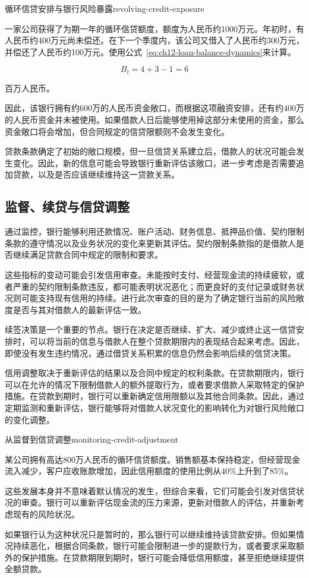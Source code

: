 \begin{example}{循环信贷安排与银行风险暴露}{revolving-credit-exposure}

一家公司获得了为期一年的循环信贷额度，额度为人民币约1000万元。年初时，有人民币约400万元尚未偿还。在下一个季度内，该公司又借入了人民币约300万元，并偿还了人民币约100万元。使用公式~\ref{eq:ch12-loan-balance-dynamics}来计算。

\[
B_t=4+3-1=6
\]

百万人民币。

因此，该银行拥有约600万的人民币资金敞口，而根据这项融资安排，还有约400万的人民币资金并未被使用。如果借款人日后能够使用掉这部分未使用的资金，那么资金敞口将会增加，但合同规定的信贷限额则不会发生变化。

\end{example}

贷款条款确定了初始的敞口规模，但一旦信贷关系建立后，借款人的状况可能会发生变化。因此，新的信息可能会导致银行重新评估该敞口，进一步考虑是否需要追加贷款，以及是否应该继续维持这一贷款关系。

\subsection{监督、续贷与信贷调整}

通过监控，银行能够利用还款情况、账户活动、财务信息、抵押品价值、契约限制条款的遵守情况以及业务状况的变化来更新其评估。契约限制条款指的是借款人是否继续满足贷款合同中规定的限制和要求。

这些指标的变动可能会引发信用审查。未能按时支付、经营现金流的持续疲软，或者严重的契约限制条款违反，都可能表明状况恶化；而更良好的支付记录或财务状况则可能支持现有信用的持续。进行此次审查的目的是为了确定银行当前的风险敞度是否与其对借款人的最新评估一致。

续签决策是一个重要的节点。银行在决定是否继续、扩大、减少或终止这一信贷安排时，可以将当前的信息与借款人在整个贷款期限内的表现结合起来考虑。因此，即使没有发生违约情况，通过借贷关系积累的信息仍然会影响后续的信贷决策。

信用调整取决于重新评估的结果以及合同中规定的权利条款。在贷款期限内，银行可以在允许的情况下限制借款人的额外提取行为，或者要求借款人采取特定的保护措施。在贷款到期时，银行可以重新确定信用限额以及其他合同条款。因此，通过定期监测和重新评估，银行能够将对借款人状况变化的影响转化为对银行风险敞口的变化调整。

\begin{example}{从监督到信贷调整}{monitoring-credit-adjustment}

某公司拥有高达800万人民币的循环信贷额度。销售额基本保持稳定，但经营现金流入减少，客户应收账款增加，因此信用额度的使用比例从40\%上升到了85\%。 

这些发展本身并不意味着默认情况的发生，但综合来看，它们可能会引发对信贷状况的审查。银行可以重新评估现金流的压力来源，更新对借款人的评估，并重新考虑现有的风险状况。

如果银行认为这种状况只是暂时的，那么银行可以继续维持该贷款安排。但如果情况持续恶化，根据合同条款，银行可能会限制进一步的提款行为，或者要求采取额外的保护措施。在贷款期限到期时，银行可能会降低信用额度，甚至拒绝继续提供全额贷款。

\end{example}

